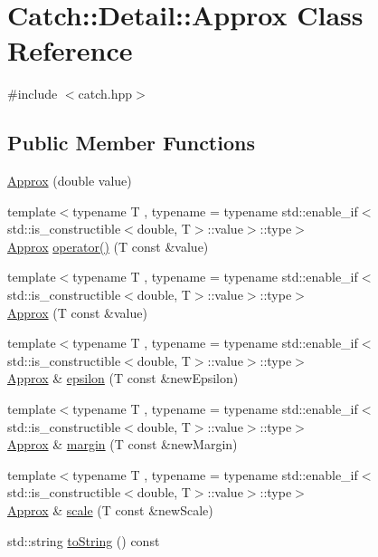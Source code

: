 \hypertarget{class_catch_1_1_detail_1_1_approx}{}\section{Catch\+:\+:Detail\+:\+:Approx Class Reference}
\label{class_catch_1_1_detail_1_1_approx}


{\ttfamily \#include $<$catch.\+hpp$>$}

\subsection*{Public Member Functions}
\begin{DoxyCompactItemize}
\item 
\mbox{\hyperlink{class_catch_1_1_detail_1_1_approx_a1a8618ea8db08c66bd3d9fe8f74b957a}{Approx}} (double value)
\item 
{\footnotesize template$<$typename T , typename  = typename std\+::enable\+\_\+if$<$std\+::is\+\_\+constructible$<$double, T$>$\+::value$>$\+::type$>$ }\\\mbox{\hyperlink{class_catch_1_1_detail_1_1_approx}{Approx}} \mbox{\hyperlink{class_catch_1_1_detail_1_1_approx_ad8b2757f4804f9a1d3fa674efb98c20e}{operator()}} (T const \&value)
\item 
{\footnotesize template$<$typename T , typename  = typename std\+::enable\+\_\+if$<$std\+::is\+\_\+constructible$<$double, T$>$\+::value$>$\+::type$>$ }\\\mbox{\hyperlink{class_catch_1_1_detail_1_1_approx_ab14b979fa8a37f21d037157fabed4072}{Approx}} (T const \&value)
\item 
{\footnotesize template$<$typename T , typename  = typename std\+::enable\+\_\+if$<$std\+::is\+\_\+constructible$<$double, T$>$\+::value$>$\+::type$>$ }\\\mbox{\hyperlink{class_catch_1_1_detail_1_1_approx}{Approx}} \& \mbox{\hyperlink{class_catch_1_1_detail_1_1_approx_acd26adba86a066b9f40dad467f23bc85}{epsilon}} (T const \&new\+Epsilon)
\item 
{\footnotesize template$<$typename T , typename  = typename std\+::enable\+\_\+if$<$std\+::is\+\_\+constructible$<$double, T$>$\+::value$>$\+::type$>$ }\\\mbox{\hyperlink{class_catch_1_1_detail_1_1_approx}{Approx}} \& \mbox{\hyperlink{class_catch_1_1_detail_1_1_approx_a6467dc18791e1a1f4c15c4fb63cf5051}{margin}} (T const \&new\+Margin)
\item 
{\footnotesize template$<$typename T , typename  = typename std\+::enable\+\_\+if$<$std\+::is\+\_\+constructible$<$double, T$>$\+::value$>$\+::type$>$ }\\\mbox{\hyperlink{class_catch_1_1_detail_1_1_approx}{Approx}} \& \mbox{\hyperlink{class_catch_1_1_detail_1_1_approx_a8f4d2def2920a3840d3271f6d9c5ede2}{scale}} (T const \&new\+Scale)
\item 
std\+::string \mbox{\hyperlink{class_catch_1_1_detail_1_1_approx_a972fd9ac60607483263f1b0f0f9955e6}{to\+String}} () const
\end{DoxyCompactItemize}
